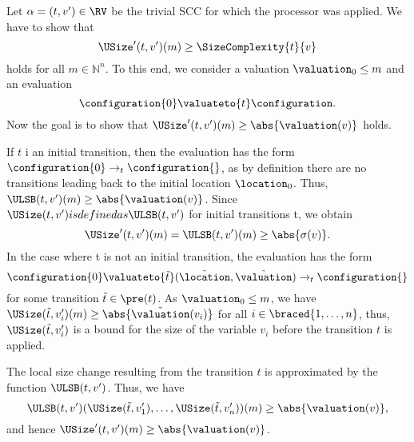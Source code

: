 Let $\alpha = (t, v') \in \RV$ be the trivial SCC for which the processor was applied.
We have to show that
\[ \USize'(t, v')(m) \geq \SizeComplexity{t}{v} \]
holds for all $m \in \mathbb{N}^n$. To this end, we consider a valuation $\valuation_0 \leq m$ and an evaluation
\[ \configuration{0} \valuateto{t} \configuration. \]
Now the goal is to show that $\USize'(t, v')(m) \geq \abs{\valuation(v)}$ holds.

If $t$ i an initial transition, then the evaluation has the form $\configuration{0} \rightarrow_t \configuration{}$, as by definition there are no transitions leading back to the initial location $\location_0$. Thus, $\ULSB(t, v')(m) \geq \abs{\valuation(v)}$. Since $\USize(t, v') is defined as \ULSB(t, v')$ for initial transitions t, we obtain
\[ \USize'(t, v')(m) = \ULSB(t, v')(m) \geq \abs{\sigma(v)}. \]
In the case where t is not an initial transition, the evaluation has the form
\[ \configuration{0}  \valuateto{\tilde{t}} (\tilde{\location}, \tilde{\valuation}) \rightarrow_t \configuration{} \]
for some transition $\tilde{t} \in \pre(t)$. As $\valuation_0 \leq m$, we have $\USize(\tilde{t}, v'_i)(m) \geq \abs{\tilde{\valuation}(v_i)}$ for all $i \in \braced{1,\dots,n}$, thus, $\USize(\tilde{t}, v'_i)$ is a bound for the size of the variable $v_i$ before the transition $t$ is applied.

The local size change resulting from the transition $t$ is approximated by the function $\ULSB(t, v')$. Thus, we have
\[ \ULSB(t, v')(\USize(\tilde{t}, v'_1),\dots,\USize(\tilde{t}, v'_n))(m) \geq \abs{\valuation(v)}, \]
and hence $\USize'(t, v')(m) \geq \abs{\valuation(v)}$.
